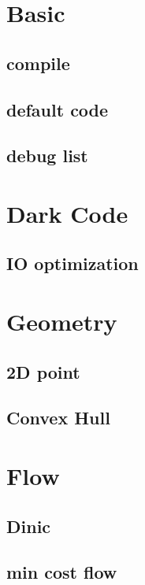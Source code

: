 \section{Basic}

\subsection{compile}

\subsection{default code}

\subsection{debug list}


\section{Dark Code}

\subsection{IO optimization}


\section{Geometry}

\subsection{2D point}

\subsection{Convex Hull}


\section{Flow}

\subsection{Dinic}

\subsection{min cost flow}


